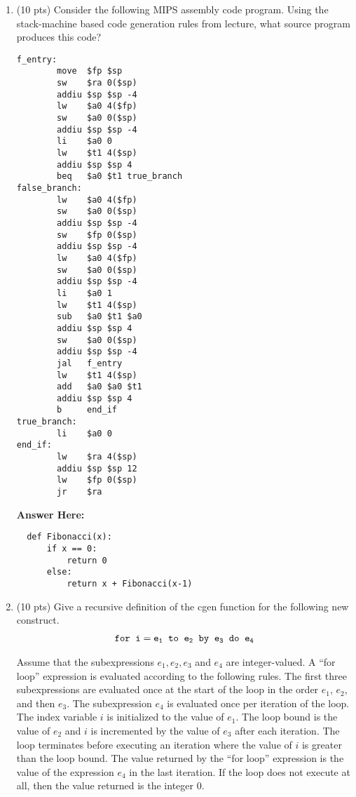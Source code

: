 \documentclass[10pt]{article}
\begin{document}
\begin{enumerate}
\item (10 pts) Consider the following MIPS assembly code program.  Using the
stack-machine based code generation rules from lecture, what source program produces this
code?
\begin{verbatim}
f_entry:
        move  $fp $sp
        sw    $ra 0($sp)
        addiu $sp $sp -4
        lw    $a0 4($fp)
        sw    $a0 0($sp)
        addiu $sp $sp -4
        li    $a0 0
        lw    $t1 4($sp)
        addiu $sp $sp 4
        beq   $a0 $t1 true_branch
false_branch:
        lw    $a0 4($fp)
        sw    $a0 0($sp)
        addiu $sp $sp -4
        sw    $fp 0($sp)
        addiu $sp $sp -4
        lw    $a0 4($fp)
        sw    $a0 0($sp)
        addiu $sp $sp -4
        li    $a0 1
        lw    $t1 4($sp)
        sub   $a0 $t1 $a0
        addiu $sp $sp 4
        sw    $a0 0($sp)
        addiu $sp $sp -4
        jal   f_entry
        lw    $t1 4($sp)
        add   $a0 $a0 $t1
        addiu $sp $sp 4
        b     end_if
true_branch:
        li    $a0 0
end_if:
        lw    $ra 4($sp)
        addiu $sp $sp 12
        lw    $fp 0($sp)
        jr    $ra
\end{verbatim}
\textbf{Answer Here:}
\begin{verbatim}
  def Fibonacci(x):
      if x == 0:
          return 0
      else:
          return x + Fibonacci(x-1)
\end{verbatim}

\item (10 pts) Give a recursive definition of the cgen function for the following new construct.
\begin{eqnarray*}
\tt{for}\;\; i = e_1 \;\;to\;\; e_2 \;\;\tt{by}\;\; e_3 \;\;\tt{do }\;\; e_4
\end{eqnarray*}

Assume that the subexpressions $e_1, e_2, e_3$ and $e_4$ are
integer-valued. A ``for loop'' expression is evaluated according to
the following rules. The first three subexpressions are evaluated once
at the start of the loop in the order $e_1$, $e_2$, and then $e_3$.
The subexpression $e_4$ is evaluated once per iteration of the loop.
The index variable $i$ is initialized to the value of $e_1$.
The loop bound is the value of $e_2$ and $i$ is incremented by the
value of $e_3$ after each iteration. The loop terminates before
executing an iteration where the value of $i$ is greater than the
loop bound. The value returned by the ``for loop'' expression is the value of the
expression $e_4$ in the last iteration. If the loop does not execute
at all, then the value returned is the integer $0$.


\end{enumerate}
\end{document}
